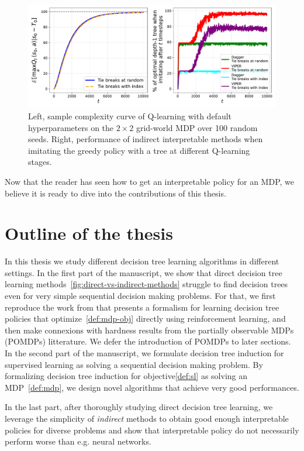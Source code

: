 \begin{figure}
    \centering
    \includegraphics[width=1\textwidth]{images/images_part1/base_mdp.pdf}
    \caption{Left, sample complexity curve of Q-learning with default hyperparameters on the $2\times 2$ grid-world MDP over 100 random seeds. Right, performance of indirect interpretable methods when imitating the greedy policy with a tree at different Q-learning stages.}\label{fig:ql-il}
\end{figure}


Now that the reader has seen how to get an interpretable policy for an MDP, we believe it is ready to dive into the contributions of this thesis.

\section{Outline of the thesis}

In this thesis we study different decision tree learning algorithms in different settings. 
In the first part of the manuscript, we show that direct decision tree learning methods~\ref{fig:direct-vs-indirect-methods} struggle to find decision trees even for very simple sequential decision making problems.
For that, we first reproduce the work from\cite{topin2021iterative} that presents a formalism for learning decision tree policies that optimize~\ref{def:mdp-obj} directly using reinforcement learning, and then make connexions with hardness results from the partially observable MDPs (POMDPs)\cite{POMDP} litterature.
We defer the introduction of POMDPs to later sections.
In the second part of the manuscript, we formulate decision tree induction for supervised learning as solving a sequential decision making problem.
By formalizing decision tree induction for objective\ref{def:sl} as solving an MDP~\ref{def:mdp}, we design novel algorithms that achieve very good performances.

In the last part, after thoroughly studying direct decision tree learning, we leverage the simplicity of \textit{indirect} methods to obtain good enough interpretable policies for diverse problems and show that interpretable policy do not necessarily perform worse than e.g. neural networks.

